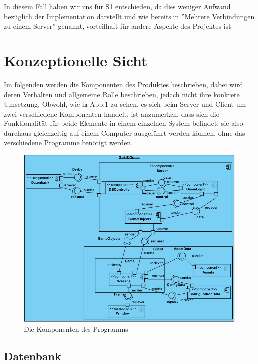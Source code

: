 \documentclass[fontsize=12pt,paper=a4,twoside]{scrartcl}
\begin{document}
In diesem Fall haben wir uns für S1 entschieden, da dies weniger Aufwand bezüglich der Implementation darstellt und wie bereits in ''Mehrere Verbindungen zu einem Server'' genannt, vorteilhaft für andere Aspekte des Projektes ist.




\section{Konzeptionelle Sicht}
\label{sec:konzeptionell}

Im folgenden werden die Komponenten des Produktes beschrieben, dabei wird deren Verhalten und allgemeine Rolle beschrieben, jedoch nicht ihre konkrete Umsetzung. Obwohl, wie in Abb.1 zu sehen, es sich beim Server und Client um zwei verschiedene Komponenten handelt, ist anzumerken, dass sich die Funktionalität für beide Elemente in einem einzelnen System befindet, sie also durchaus gleichzeitig auf einem Computer ausgeführt werden können, ohne das verschiedene Programme benötigt werden.

\begin{figure}[h]
\centering
\includegraphics[width=1\linewidth]{ComponentDiagram1}
\caption[Komponenten des Programms]{Die Komponenten des Programms}
\label{fig:ComponentDiagram1}
\end{figure}

\subsection{Datenbank}
\end{document}
